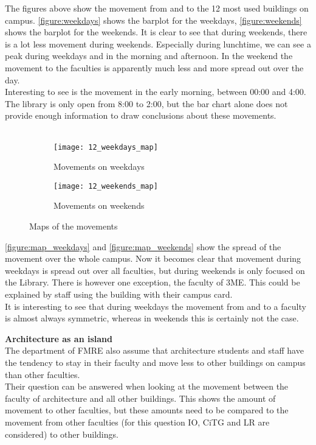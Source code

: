 The figures above show the movement from and to the 12 most used buildings on campus. \autoref{figure:weekdays} shows the barplot for the weekdays, \autoref{figure:weekends} shows the barplot for the weekends. It is clear to see that during weekends, there is a lot less movement during weekends. Especially during lunchtime, we can see a peak during weekdays and in the morning and afternoon. In the weekend the movement to the faculties is apparently much less and more spread out over the day.\\
Interesting to see is the movement in the early morning, between 00:00 and 4:00. The library is only open from 8:00 to 2:00, but the bar chart alone does not provide enough information to draw conclusions about these movements.\\\\
\begin{figure}[H]
	\captionsetup[subfigure]{justification=centering}
	\begin{subfigure}[t]{0.48\textwidth}
	\texttt{[image: 12\_weekdays\_map]}
	\caption{Movements on weekdays}
	\label{figure:map_weekdays}
	\end{subfigure}
	\begin{subfigure}[t]{0.48\textwidth}
	\texttt{[image: 12\_weekends\_map]}
	\caption{Movements on weekends}
	\label{figure:map_weekends}
	\end{subfigure}
	\captionsetup{justification=centering}
	\caption{Maps of the movements}
\end{figure}
\autoref{figure:map_weekdays} and \autoref{figure:map_weekends} show the spread of the movement over the whole campus. Now it becomes clear that movement during weekdays is spread out over all faculties, but during weekends is only focused on the Library. There is however one exception, the faculty of 3ME. This could be explained by staff using the building with their campus card. \\

It is interesting to see that during weekdays the movement from and to a faculty is almost always symmetric, whereas in weekends this is certainly not the case. 

\textbf{Architecture as an island}\\
The department of FMRE also assume that architecture students and staff have the tendency to stay in their faculty and move less to other buildings on campus than other faculties. \\
Their question can be answered when looking at the movement between the faculty of architecture and all other buildings. This shows the amount of movement to other faculties, but these amounts need to be compared to the movement from other faculties (for this question IO, CiTG and LR are considered) to other buildings. \\

